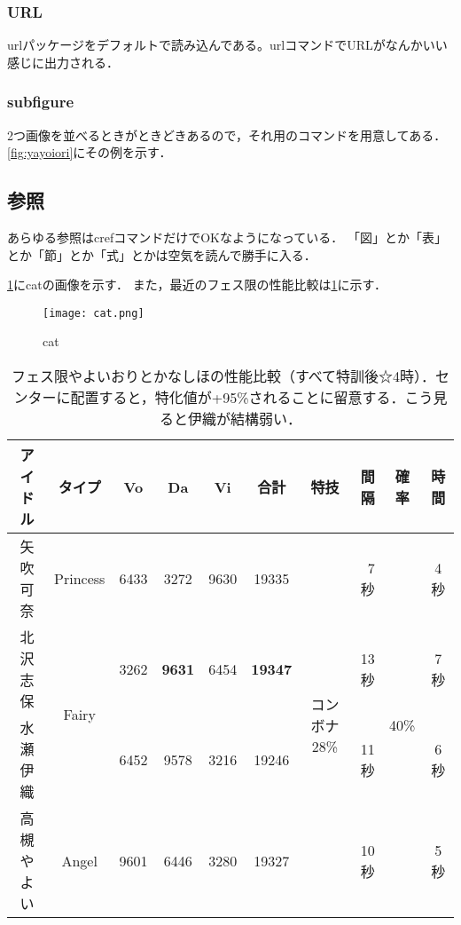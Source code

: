 \subsubsection{URL}

urlパッケージをデフォルトで読み込んである。urlコマンドでURLがなんかいい感じに出力される．

\subsubsection{subfigure}

2つ画像を並べるときがときどきあるので，それ用のコマンドを用意してある．
\ref{fig:yayoiori}にその例を示す．


\subsection{参照}

あらゆる参照はcrefコマンドだけでOKなようになっている．
「図」とか「表」とか「節」とか「式」とかは空気を読んで勝手に入る．

\cref{fig:kana}にcatの画像を示す．
また，最近のフェス限の性能比較は\cref{tbl:fes}に示す．

\begin{figure}
    \centering
    \texttt{[image: cat.png]}
    \caption{cat}
    \label{fig:kana}
\end{figure}

\begin{table}
    \centering
    \caption[フェス限やよいおりとかなしほの性能比較]{フェス限やよいおりとかなしほの性能比較（すべて特訓後☆4時）．センターに配置すると，特化値が+95\%されることに留意する．こう見ると伊織が結構弱い．}
    \begin{tabular}{cc|cccc|crcc}
        \toprule
        アイドル & タイプ & Vo & Da  & Vi & 合計 & 特技 & 間隔 & 確率 & 時間 \\ \hline\hline
        矢吹可奈 & Princess & 6433 & 3272 & 9630 & 19335 & \multirow{4}{*}{コンボナ28\%} & 7秒 & \multirow{4}{*}{40\%} & 4秒 \\\cline{1-6}\cline{8-8}\cline{10-10}
        北沢志保 & \multirow{2}{*}{Fairy} & 3262 & \textbf{9631} & 6454 & \textbf{19347} & & 13秒 & & 7秒 \\\cline{1-1}\cline{3-6}\cline{8-8}\cline{10-10}
        水瀬伊織 &  & 6452 & 9578 & 3216 & 19246 & & 11秒 & & 6秒 \\\cline{1-6}\cline{8-8}\cline{10-10}
        高槻やよい & Angel & 9601 & 6446 & 3280 & 19327 & & 10秒 & & 5秒\\
        \bottomrule
    \end{tabular}
    \label{tbl:fes}
\end{table}

